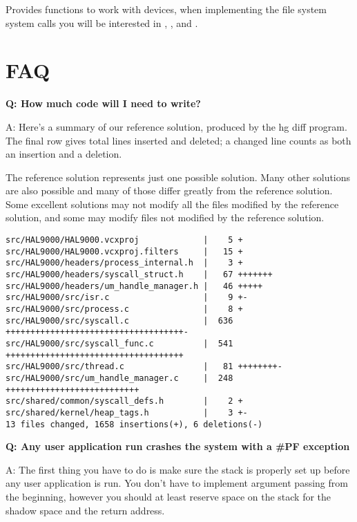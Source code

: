 
Provides functions to work with devices, when implementing the file system system calls you will be
interested in , ,  and .

\section{FAQ}

\textbf{Q: How much code will I need to write?}

A: Here’s a summary of our reference solution, produced by the hg  diff program. The final row gives
total lines inserted and deleted; a changed line counts as both an insertion and a deletion.

The reference solution represents just one possible solution. Many other solutions are also possible
and many of those differ greatly from the reference solution. Some excellent solutions may not
modify all the files modified by the reference solution, and some may modify files not modified by
the reference solution.

\begin{verbatim}
src/HAL9000/HAL9000.vcxproj             |    5 +
src/HAL9000/HAL9000.vcxproj.filters     |   15 +
src/HAL9000/headers/process_internal.h  |    3 +
src/HAL9000/headers/syscall_struct.h    |   67 +++++++
src/HAL9000/headers/um_handle_manager.h |   46 +++++
src/HAL9000/src/isr.c                   |    9 +-
src/HAL9000/src/process.c               |    8 +
src/HAL9000/src/syscall.c               |  636 ++++++++++++++++++++++++++++++++++++-
src/HAL9000/src/syscall_func.c          |  541 ++++++++++++++++++++++++++++++++++++
src/HAL9000/src/thread.c                |   81 ++++++++-
src/HAL9000/src/um_handle_manager.c     |  248 +++++++++++++++++++++++++++
src/shared/common/syscall_defs.h        |    2 +
src/shared/kernel/heap_tags.h           |    3 +-
13 files changed, 1658 insertions(+), 6 deletions(-)
\end{verbatim}

\newline

\textbf{Q: Any user application run crashes the system with a \#PF exception}

A: The first thing you have to do is make sure the stack is properly set up before any user
application is run. You don't have to implement argument passing from the beginning, however you
should at least reserve space on the stack for the shadow space and the return address.

